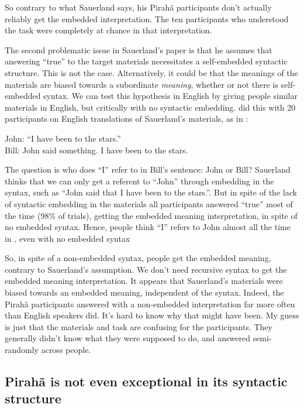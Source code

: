 \documentclass[output=paper]{langscibook}
\begin{document}
So contrary to what Sauerland says, his Pirahã participants don’t actually reliably get the embedded interpretation. The ten participants who understood the task were completely at chance in that interpretation.

The second problematic issue in Sauerland's paper is that he assumes that answering ``true'' to the target materials necessitates a self-embedded syntactic structure.  This is not the case.  Alternatively, it could be that the meanings of the materials are biased towards a subordinate \textit{meaning}, whether or not there is self-embedded syntax.  We can test this hypothesis in English by giving people similar materials in English, but critically with no syntactic embedding.  \citet{everett2019recursion} did this with 20 participants on English translations of Sauerland's materials, as in : 

\ea
\label{ev_gib2019_ex}
John: ``I have been to the stars.''\\
Bill: John said something. I have been to the stars.
\z

The question is who does ``I'' refer to in Bill’s sentence:  John or Bill? Sauerland thinks that we can only get a referent to ``John'' through embedding in the syntax, such as ``John said that I have been to the stars.''.  But in spite of the lack of syntactic embedding in the materials all participants answered ``true'' most of the time (98\% of trials), getting the embedded meaning interpretation, in spite of no embedded syntax.  Hence, people think ``I'' refers to John almost all the time in , even with no embedded syntax

So, in spite of a non-embedded syntax, people get the embedded meaning, contrary to Sauerland’s assumption.  We don’t need recursive syntax to get the embedded meaning interpretation.  It appears that Sauerland's materials were biased towards an embedded meaning, independent of the syntax. Indeed, the Pirahã participants answered with a non-embedded interpretation far more often than English speakers did. It's hard to know why that might have been.  My guess is just that the materials and task are confusing for the participants.  They generally didn't know what they were supposed to do, and answered semi-randomly across people.

\subsection{Pirahã is not even exceptional in its syntactic structure}
\end{document}
